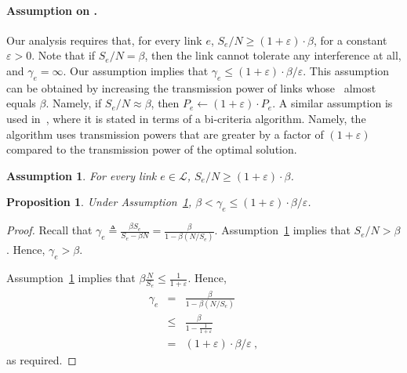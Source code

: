\documentclass[11pt]{article}
\newenvironment{proof sketch}{\noindent {\bf Proof sketch:} }{\hfill \qed}
\newtheorem{proposition}{Proposition}
\newtheorem{assumption}{Assumption}
\newcommand{\eps}{\varepsilon}
\newcommand{\snr}{\text{\sc{snr}}}
\newcommand{\LL}{\mathcal{L}}
\newcommand{\eqdf}{\triangleq}
\begin{document}
\paragraph{Assumption on \snr.} Our analysis requires that, for every
link $e$, $S_e/N\geq (1+\eps)\cdot \beta$, for a constant $\eps>0$.
Note that if $S_e/N=\beta$, then the link cannot tolerate any
interference at all, and $\gamma_e=\infty$.  Our assumption implies
that $\gamma_e \leq (1+\eps)\cdot \beta/\eps$.  This assumption can be
obtained by increasing the transmission power of links whose \snr\
almost equals $\beta$.  Namely, if $S_e/N \approx \beta$, then
$P_e\gets (1+\eps)\cdot P_e$.  A similar assumption is used
in~\cite{ChafekarCapacity}, where it is stated in terms of a
bi-criteria algorithm. Namely, the algorithm uses transmission powers
that are greater by a factor of $(1+\eps)$ compared to the transmission power
of the optimal solution.
\begin{assumption}\label{assume:gamma}
  For every link $e\in \LL$, $S_e/N \geq (1+\eps)\cdot \beta$.
\end{assumption}
\begin{proposition}\label{prop:gamma}
  Under Assumption~\ref{assume:gamma}, $\beta < \gamma_e \leq (1+\eps)\cdot \beta/\eps$.
\end{proposition}
\begin{proof}
    Recall that $\gamma_e \eqdf \frac{\beta S_e}{S_e - \beta N}= \frac{\beta}{1-\beta(N/S_e)}$.
    Assumption~\ref{assume:gamma} implies that  $S_e/N >\beta$.
    Hence, $\gamma_e > \beta$.

    Assumption~\ref{assume:gamma} implies that  $\beta \frac {N}{S_e} \leq \frac 1 {1+\eps}$.
    Hence,
    \begin{eqnarray*}
        \gamma_e    &=     & \frac{\beta}{1-\beta(N/S_e)} \\
                    & \leq & \frac{\beta}{1-\frac 1 {1+\eps}} \\
                    & = & (1+\eps)\cdot \beta / \eps\:,
    \end{eqnarray*}
    as required.
\end{proof}
\end{document}
